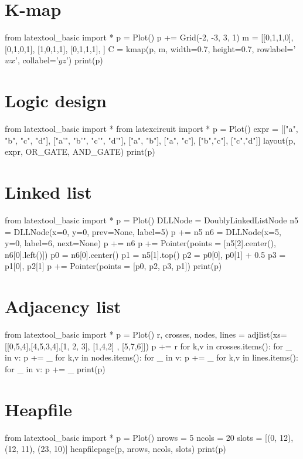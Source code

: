 \section{K-map}
\begin{python}
from latextool_basic import *
p = Plot()
p += Grid(-2, -3, 3, 1)
m = [[0,1,1,0],
[0,1,0,1],
[1,0,1,1],
[0,1,1,1],
]
C = kmap(p, m, width=0.7, height=0.7,
rowlabel='$wx$', collabel='$yz$')
print(p)
\end{python}



\section{Logic design}
\begin{python}
from latextool_basic import *
from latexcircuit import *
p = Plot()
expr = [["a", "b", "c", "d"], ["a'", "b'", "c'", "d'"],
["a", "b"], ["a", "c"], ["b","c"], ["c","d"]]
layout(p, expr, OR_GATE, AND_GATE)
print(p)
\end{python}


\section{Linked list}
\begin{python}
from latextool_basic import *
p = Plot()
DLLNode = DoublyLinkedListNode
n5 = DLLNode(x=0, y=0, prev=None, label=5)
p += n5
n6 = DLLNode(x=5, y=0, label=6, next=None)
p += n6
p += Pointer(points = [n5[2].center(), n6[0].left()])
p0 = n6[0].center()
p1 = n5[1].top()
p2 = p0[0], p0[1] + 0.5
p3 = p1[0], p2[1]
p += Pointer(points = [p0, p2, p3, p1])
print(p)
\end{python}

\section{Adjacency list}
\begin{python}
from latextool_basic import *
p = Plot()
r, crosses, nodes, lines = adjlist(xs=[[0,5,4],[4,5,3,4],[1, 2, 3], [1,4,2]
, [5,7,6]])
p += r
for k,v in crosses.items():
    for _ in v: p += _
for k,v in nodes.items():
    for _ in v: p += _
for k,v in lines.items():
    for _ in v: p += _
print(p)
\end{python}



\section{Heapfile}
\begin{python}
from latextool_basic import *
p = Plot()
nrows = 5
ncols = 20
slots = [(0, 12), (12, 11), (23, 10)]
heapfilepage(p, nrows, ncols, slots)
print(p)
\end{python}


